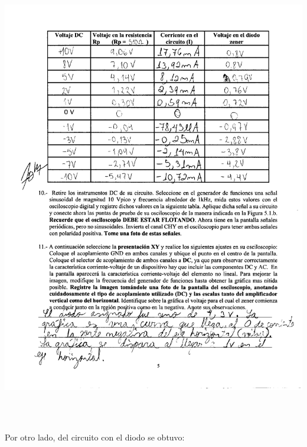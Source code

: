 \documentclass[12pt]{article}
\begin{document}
	\begin{center}
		\includegraphics[width=16cm,height=20cm]{Img/anexo_0003}
	\end{center}
	
	\noindent Por otro lado, del circuito con el diodo se obtuvo:
	
\end{document}
